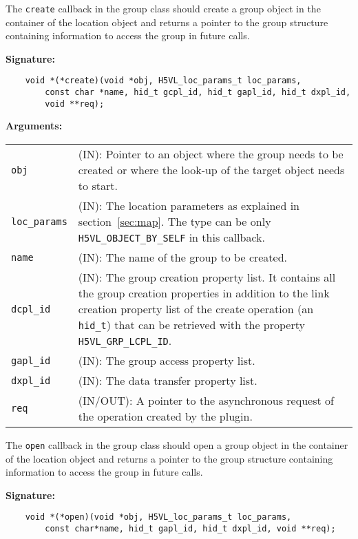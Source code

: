 The {\tt create} callback in the group class should create a group
object in the container of the location object and returns a pointer
to the group structure containing information to access the group in
future calls.

\textbf{Signature:}
\begin{lstlisting}
    void *(*create)(void *obj, H5VL_loc_params_t loc_params, 
        const char *name, hid_t gcpl_id, hid_t gapl_id, hid_t dxpl_id, 
        void **req);
\end{lstlisting}

\textbf{Arguments:}\\
\begin{tabular}{l p{10cm}}
  {\tt obj} & (IN): Pointer to an object where the group needs
  to be created or where the look-up of the target object needs to
  start.\\
  {\tt loc\_params} & (IN): The location parameters as explained in
  section~\ref{sec:map}. The type can be only {\tt
    H5VL\_OBJECT\_BY\_SELF} in this callback. \\
  {\tt name} & (IN): The name of the group to be created.\\
  {\tt dcpl\_id} & (IN): The group creation property list. It contains
  all the group creation properties in addition to the link creation
  property list of the create operation (an {\tt hid\_t}) that can be
  retrieved with the property {\tt H5VL\_GRP\_LCPL\_ID}.\\
  {\tt gapl\_id} & (IN): The group access property list.\\
  {\tt dxpl\_id} & (IN): The data transfer property list.\\
  {\tt req} & (IN/OUT): A pointer to the asynchronous request of the
  operation created by the plugin.\\
\end{tabular}

The {\tt open} callback in the group class should open a group object
in the container of the location object and returns a pointer to the
group structure containing information to access the group in future
calls.

\textbf{Signature:}
\begin{lstlisting}
    void *(*open)(void *obj, H5VL_loc_params_t loc_params, 
        const char*name, hid_t gapl_id, hid_t dxpl_id, void **req);
\end{lstlisting}

